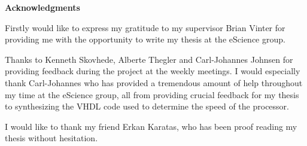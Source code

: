 
\thispagestyle{empty}

\hspace{0pt}
\vfill
\begin{center}
    \large
    \textbf{Acknowledgments}
\end{center}

Firstly would like to express my gratitude to my supervisor Brian Vinter for providing me with the opportunity to write my thesis at the eScience group.

Thanks to Kenneth Skovhede, Alberte Thegler and Carl-Johannes Johnsen for providing feedback during the project at the weekly meetings. I would especially thank Carl-Johannes who has provided a tremendous amount of help throughout my time at the eScience group, all from providing crucial feedback for my thesis to synthesizing the VHDL code used to determine the speed of the processor.

I would like to thank my friend Erkan Karatas, who has been proof reading my thesis without hesitation.

\vfill
\hspace{0pt}